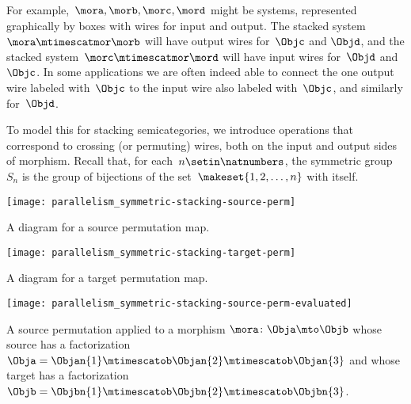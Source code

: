 For example,~$\mora, \morb, \morc, \mord$ might be systems, represented graphically by boxes with wires for input and output.
The stacked system~$\mora \mtimescatmor \morb$ will have output wires for~$\Objc$ and $\Objd$, and the stacked system~$\morc \mtimescatmor \mord$ will have input wires for~$\Objd$ and~$\Objc$.
In some applications we are often indeed able to connect the one output wire labeled with~$\Objc$ to the input wire also labeled with~$\Objc$, and similarly for~$\Objd$.

To model this for stacking semicategories, we introduce operations that correspond to crossing (or permuting) wires, both on the input and output sides of morphism.
Recall that, for each~$n \setin \natnumbers$, the symmetric group $S_n$ is the group of bijections of the set~$\makeset{1, 2, \ldots, n }$ with itself.


\begin{marginfigure}
    \centering
    \texttt{[image: parallelism\_symmetric-stacking-source-perm]}
    \caption{A diagram for a source permutation map.}
    \label{fig:symmetric-stacking-left-perm}
\end{marginfigure}

\begin{marginfigure}
    \centering
    \texttt{[image: parallelism\_symmetric-stacking-target-perm]}
    \caption{A diagram for a target permutation map.}
\end{marginfigure}

\begin{marginfigure}
    \centering
    \texttt{[image: parallelism\_symmetric-stacking-source-perm-evaluated]}
    \caption{A source permutation applied to a morphism $\mora \colon \Obja \mto \Objb$ whose source has a factorization $\Obja = \Objan{1} \mtimescatob \Objan{2}  \mtimescatob \Objan{3}$ and whose target has a factorization $\Objb = \Objbn{1} \mtimescatob \Objbn{2}  \mtimescatob \Objbn{3}$.}
    \label{fig:symmetric-stacking-left-perm-evaluated}
\end{marginfigure}

